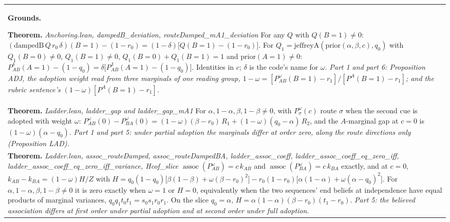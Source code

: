 \documentclass[10pt]{article}
\theoremstyle{definition}
\newcommand{\PJ}{P^{\mathrm{J}}}
\newcommand{\assoc}{\operatorname{assoc}}
\newlength{\fullw}\setlength{\fullw}{25.9cm}
\begin{document}
{\begin{longtable}{|p{0.9cm}|p{12.2cm}|p{12.2cm}|}
\multicolumn{3}{|p{\fullw}|}{\textbf{Grounds.}\par \textbf{Theorem.} \textit{Anchoring.lean, dampedB\_deviation, routeDamped\_mA1\_deviation} \newline For any $Q$ with $Q(B{=}1)\neq0$:
$(\mathrm{dampedB}\,Q\,r_0\,\delta)(B{=}1)-(1-r_0)=(1-\delta)\bigl[Q(B{=}1)-(1-r_0)\bigr]$.
For $Q_1=\mathrm{jeffreyA}(\mathrm{prior}(\alpha,\beta,c),q_0)$ with $Q_1(B{=}0)\neq0$,
$Q_1(B{=}1)\neq0$, $Q_1(B{=}0)+Q_1(B{=}1)=1$ and $\mathrm{prior}(A{=}1)\neq0$:
$P^{\delta}_{AB}(A{=}1)-(1-q_0)=\delta\bigl[\PJ_{AB}(A{=}1)-(1-q_0)\bigr]$.
Identities in $c$; $\delta$ is the code's name for $\omega$. \newline \textit{Part 1 and part 6: Proposition ADJ, the adoption weight read from three marginals of one reading group, $1-\omega=[P^{\omega}_{AB}(B{=}1)-r_1]/[P^{A}(B{=}1)-r_1]$; and the rubric sentence's $(1-\omega)[P^{A}(B{=}1)-r_1]$.}} \\
\multicolumn{3}{|p{\fullw}|}{\textbf{Theorem.} \textit{Ladder.lean, ladder\_gap and ladder\_gap\_mA1} \newline For $\alpha,1-\alpha,\beta,1-\beta\neq0$, with $P^{\omega}_{\sigma}(c)$ route $\sigma$ when the
second cue is adopted with weight $\omega$:
$P^{\omega}_{AB}(0)-P^{\omega}_{BA}(0)=(1-\omega)(\beta-r_0)\,R_1+(1-\omega)(q_0-\alpha)\,R_2$, and
the $A$-marginal gap at $c=0$ is $(1-\omega)(\alpha-q_0)$. \newline \textit{Part 1 and part 5: under partial adoption the marginals differ at order zero, along the route directions only (Proposition LAD).}} \\
\multicolumn{3}{|p{\fullw}|}{\textbf{Theorem.} \textit{Ladder.lean, assoc\_routeDamped, assoc\_routeDampedBA, ladder\_assoc\_coeff, ladder\_assoc\_coeff\_eq\_zero\_iff, ladder\_assoc\_coeff\_eq\_zero\_iff\_variance, Hcof\_slice} \newline $\assoc(P^{\omega}_{AB})=c\,k_{AB}$ and $\assoc(P^{\omega}_{BA})=c\,k_{BA}$ exactly, and at
$c=0$, $k_{AB}-k_{BA}=(1-\omega)H/Z$ with
$H=q_0(1-q_0)\bigl[\beta(1-\beta)+\omega(\beta-r_0)^2\bigr]-r_0(1-r_0)\bigl[\alpha(1-\alpha)+\omega(\alpha-q_0)^2\bigr]$.
For $\alpha,1-\alpha,\beta,1-\beta\neq0$ it is zero exactly when $\omega=1$ or $H=0$,
equivalently when the two sequences' end beliefs at independence have equal products of
marginal variances, $q_0q_1t_0t_1=s_0s_1r_0r_1$. On the slice $q_0=\alpha$,
$H=\alpha(1-\alpha)(\beta-r_0)(t_1-r_0)$. \newline \textit{Part 5: the believed association differs at first order under partial adoption and at second order under full adoption.}} \\

\end{longtable}}
\end{document}
